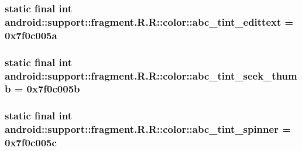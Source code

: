 \hypertarget{classandroid_1_1support_1_1fragment_1_1_r_1_1color_39a9438d96a63697138eb958743b68d4}{
\subsubsection[{abc\_\-tint\_\-edittext}]{\setlength{\rightskip}{0pt plus 5cm}static final int android::support::fragment.R.R::color::abc\_\-tint\_\-edittext = 0x7f0c005a}}
\label{classandroid_1_1support_1_1fragment_1_1_r_1_1color_39a9438d96a63697138eb958743b68d4}


\hypertarget{classandroid_1_1support_1_1fragment_1_1_r_1_1color_9e3bda3ebc9b00b948a19ba936890f87}{
\subsubsection[{abc\_\-tint\_\-seek\_\-thumb}]{\setlength{\rightskip}{0pt plus 5cm}static final int android::support::fragment.R.R::color::abc\_\-tint\_\-seek\_\-thumb = 0x7f0c005b}}
\label{classandroid_1_1support_1_1fragment_1_1_r_1_1color_9e3bda3ebc9b00b948a19ba936890f87}


\hypertarget{classandroid_1_1support_1_1fragment_1_1_r_1_1color_a93da794676dcccd026732f5004343b6}{
\subsubsection[{abc\_\-tint\_\-spinner}]{\setlength{\rightskip}{0pt plus 5cm}static final int android::support::fragment.R.R::color::abc\_\-tint\_\-spinner = 0x7f0c005c}}
\label{classandroid_1_1support_1_1fragment_1_1_r_1_1color_a93da794676dcccd026732f5004343b6}


